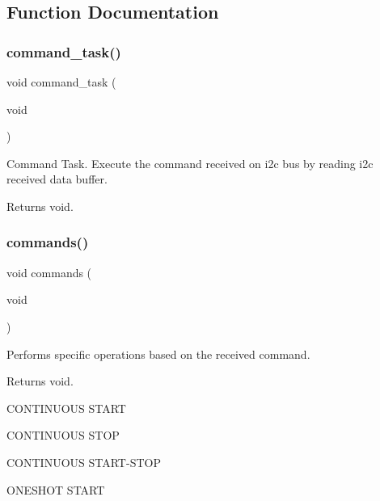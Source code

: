\subsection{Function Documentation}
\mbox{\label{i2c-th_8ino_a42389aceb96a84573eb67e6d141cb594}} 
\subsubsection{\texorpdfstring{command\+\_\+task()}{command\_task()}}
{\footnotesize\ttfamily void command\+\_\+task (\begin{DoxyParamCaption}\item[{void}]{ }\end{DoxyParamCaption})}



Command Task. Execute the command received on i2c bus by reading i2c received data buffer. 

\begin{DoxyReturn}{Returns}
void. 
\end{DoxyReturn}
\mbox{\label{i2c-th_8ino_a4981066e183f1432ffd6eddf55826585}} 
\subsubsection{\texorpdfstring{commands()}{commands()}}
{\footnotesize\ttfamily void commands (\begin{DoxyParamCaption}\item[{void}]{ }\end{DoxyParamCaption})}



Performs specific operations based on the received command. 

\begin{DoxyReturn}{Returns}
void. 
\end{DoxyReturn}
C\+O\+N\+T\+I\+N\+U\+O\+US S\+T\+A\+RT

C\+O\+N\+T\+I\+N\+U\+O\+US S\+T\+OP

C\+O\+N\+T\+I\+N\+U\+O\+US S\+T\+A\+R\+T-\/\+S\+T\+OP

O\+N\+E\+S\+H\+OT S\+T\+A\+RT

